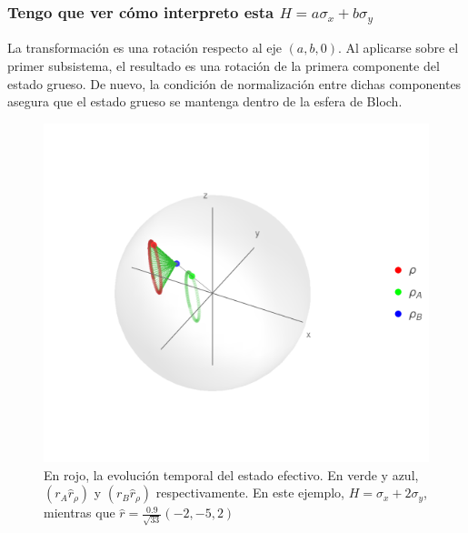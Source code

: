 \subsubsection{Tengo que ver cómo interpreto esta $H=a\sigma_{x}+b\sigma_{y}$}
La transformación es una rotación respecto al eje $(a,b,0)$. Al aplicarse sobre el primer subsistema, el resultado es una rotación de la primera componente del estado grueso. De nuevo, la condición de normalización entre dichas componentes asegura que el estado grueso se mantenga dentro de la esfera de Bloch. 
\begin{figure}[h!]
    \centering
    \includegraphics[width=0.6\linewidth]{maxent/figures/U1xU2_H1=sx+sy_H2=Id_z=0.9_p=0.4_sequence.png}
    \caption{En rojo, la evolución temporal del estado efectivo. En verde y azul, $(r_{A}\hat{r}_{\rho})$ y $(r_{B}\hat{r}_{\rho})$ respectivamente. En este ejemplo, $H=\sigma_{x}+2\sigma_{y}$, mientras que $\hat{r}=\frac{0.9}{\sqrt{33}}(-2,-5,2)$}
    \label{fig:XYRot}
\end{figure}

